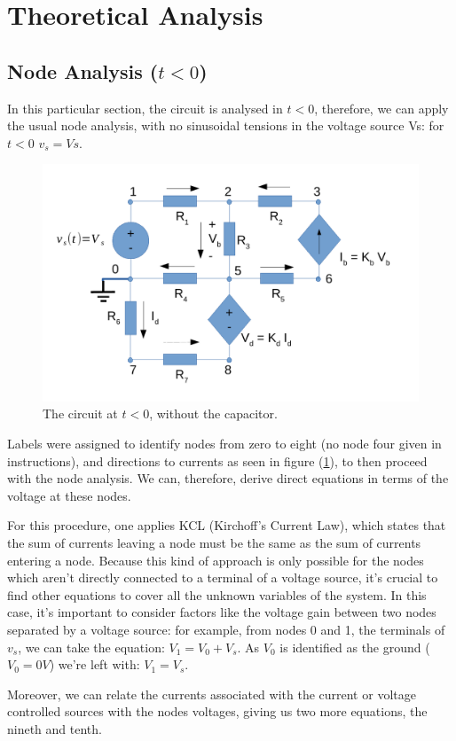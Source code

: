 \section{Theoretical Analysis}
\label{sec:analysis}



\subsection{Node Analysis ($t<0$)}

In this particular section, the circuit is analysed in $t<0$, therefore, we can apply the usual node analysis, with no sinusoidal tensions in the voltage source Vs: for $t<0$ $v_s = Vs$.

\begin{figure}[h] \centering
\includegraphics[width=0.4\linewidth]{t2-t1.pdf}
\caption{The circuit at $t<0$, without the capacitor.}
\label{fig2}
\end{figure}

Labels were assigned to identify nodes from zero to eight (no node four given in instructions), and directions to currents as seen in figure (\ref{fig2}), to then proceed with the node analysis.  We can, therefore, derive direct equations in terms of the voltage at these nodes.

For this procedure, one applies KCL (Kirchoff's Current Law), which states that the sum of currents leaving a node must be the same as the sum of currents entering a node. Because this kind of approach is only possible for the nodes which aren't directly connected to a terminal of a voltage source, it's crucial to find other equations to cover all the unknown variables of the system. In this case, it's important to consider factors like the voltage gain between two nodes separated by a voltage source: for example, from nodes 0 and 1, the terminals of $v_s$, we can take the equation: $V_1 = V_0 + V_s$. As $V_0$ is identified as the ground ($V_0 = 0V$) we're left with: $V_1 = V_s$.

Moreover, we can relate the currents associated with the current or voltage controlled sources with the nodes voltages, giving us two more equations, the nineth and tenth.


